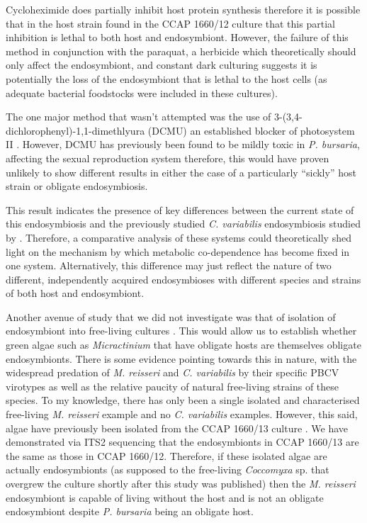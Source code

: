Cycloheximide does partially inhibit host protein synthesis
\citep{weis1984effect,Kodama2007,Kodama2008,Kodama2009a}
therefore it is possible that in the host strain found in the
CCAP 1660/12 culture that this partial inhibition is lethal to both
host and endosymbiont. However, the failure of this method in conjunction
with the paraquat, a herbicide which theoretically should only affect the endosymbiont, 
and constant dark culturing suggests it is potentially the loss of the endosymbiont
that is lethal to the host cells (as adequate bacterial
foodstocks were included in these cultures).   

The one major method that wasn't attempted was the use of 3-(3,4-dichlorophenyl)-1,1-dimethlyura (DCMU)
an established blocker of photosystem II \citep{VanGorkom1974}. 
However, DCMU has previously been found to be mildly toxic in \textit{P. bursaria}, 
affecting the sexual reproduction system \citep{Miwa2009} therefore, this would
have proven unlikely to show different results in either the case of a particularly 
``sickly'' host strain or obligate endosymbiosis. 


This result indicates the presence of key differences between the current state of this
endosymbiosis and the previously studied \textit{C. variabilis} endosymbiosis
studied by \citep{Kodama2014c}.  Therefore, a comparative analysis of these systems
could theoretically shed light on the mechanism by which metabolic co-dependence
has become fixed in one system. Alternatively, this difference may just reflect the nature of two
different, independently acquired endosymbioses with different species and strains
of both host and endosymbiont. 


Another avenue of study that we did not investigate was that of
isolation of endosymbiont into free-living cultures \citep{Achilles-Day2013a}. This would allow
us to establish whether green algae such as \textit{Micractinium} that have obligate
hosts are themselves obligate endosymbionts.  There is some evidence pointing
towards this in nature, with the widespread predation of \textit{M. reisseri}
and \textit{C. variabilis} by their specific PBCV virotypes as well as the relative
paucity of natural free-living strains of these species.  To my knowledge, there
has only been a single isolated and characterised free-living \textit{M. reisseri} \citep{Abou-Shanab2014}
example and no \textit{C. variabilis} examples.  However,
this said, algae have previously been isolated from the CCAP 1660/13 culture \citep{Achilles-Day2013a}.
We have demonstrated via ITS2 sequencing that the endosymbionts in CCAP 1660/13 are the same
as those in CCAP 1660/12. Therefore, if these isolated algae are actually endosymbionts (as supposed
to the free-living \textit{Coccomyxa} sp. that overgrew the culture shortly after this study
was published) then the \textit{M. reisseri} endosymbiont is capable of living without
the host and is not an obligate endosymbiont despite \textit{P. bursaria} being an obligate host.  

